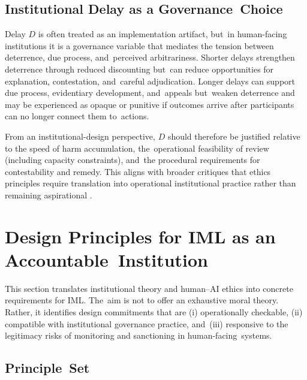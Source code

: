 \documentclass[mca,article,accept,pdftex,oneauthor]{Definitions/mdpi}
\begin{document}
\subsection{Institutional Delay as a Governance~Choice}
\label{sec:delay}

Delay $D$ is often treated as an implementation artifact, but~in human-facing institutions it is a governance variable that mediates the tension between deterrence, due process, and~perceived arbitrariness. Shorter delays strengthen deterrence through reduced discounting but~can reduce opportunities for explanation, contestation, and~careful adjudication. Longer delays can support due process, evidentiary development, and~appeals but~weaken deterrence and may be experienced as opaque or punitive if outcomes arrive after participants can no longer connect them to~actions.

From an institutional-design perspective, $D$ should therefore be justified relative to the speed of harm accumulation, the~operational feasibility of review (including capacity constraints), and~the procedural requirements for contestability and remedy. This aligns with broader critiques that ethics principles require translation into operational institutional practice rather than remaining aspirational \citep{Mittelstadt2019Principles}.

\section{Design Principles for IML as an Accountable~Institution}
\label{sec:principles}

This section translates institutional theory and human--AI ethics into concrete requirements for IML. The~aim is not to offer an exhaustive moral theory. Rather, it identifies design commitments that are (i) operationally checkable, (ii) compatible with institutional governance practice, and~(iii) responsive to the legitimacy risks of monitoring and sanctioning in human-facing~systems.

\subsection{Principle~Set}
\label{sec:principle_set}
\end{document}
